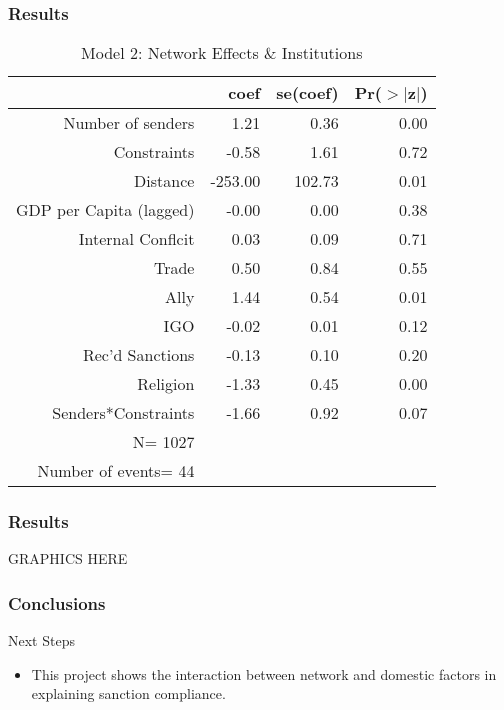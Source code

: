 \documentclass{beamer}
\begin{document}
\begin{frame}
\frametitle{Results}

%
\begin{table}[ht]
\caption{Model 2: Network Effects \& Institutions}
\begin{center}
\begin{tabular}{rrrr}
  \hline
 & coef & se(coef) & Pr($>$$|$z$|$) \\ 
  \hline
Number of senders & 1.21 & 0.36 & 0.00 \\ 
  Constraints & -0.58 & 1.61 & 0.72 \\ 
  Distance & -253.00 & 102.73 & 0.01 \\ 
  GDP per Capita (lagged) & -0.00 & 0.00 & 0.38 \\ 
  Internal Conflcit & 0.03 & 0.09 & 0.71 \\ 
  Trade & 0.50 & 0.84 & 0.55 \\ 
  Ally & 1.44 & 0.54 & 0.01 \\ 
  IGO & -0.02 & 0.01 & 0.12 \\ 
  Rec'd Sanctions & -0.13 & 0.10 & 0.20 \\ 
  Religion & -1.33 & 0.45 & 0.00 \\ 
  Senders*Constraints & -1.66 & 0.92 & 0.07 \\ 
   \hline
     N= 1027 &&&\\
     Number of events= 44 &&&\\
     \hline
\end{tabular}
\end{center}
\end{table}

\end{frame}

\begin{frame}
\frametitle{Results}
GRAPHICS HERE
\end{frame}

\begin{frame}
\frametitle{Conclusions}

Next Steps
\begin{itemize}
	\item This project shows the interaction between network and domestic factors in explaining sanction compliance.
\end{itemize}
\end{frame}
\end{document}
